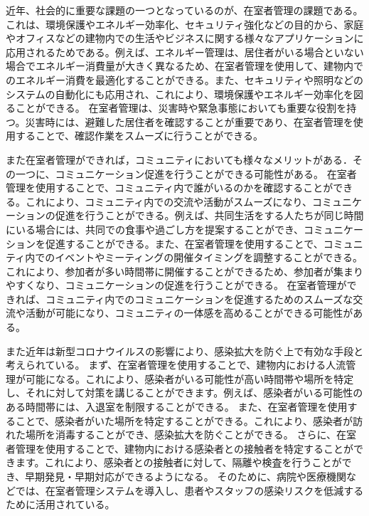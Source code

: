 近年、社会的に重要な課題の一つとなっているのが、在室者管理の課題である。これは、環境保護やエネルギー効率化、セキュリティ強化などの目的から、家庭やオフィスなどの建物内での生活やビジネスに関する様々なアプリケーションに応用されるためである。例えば、エネルギー管理は、居住者がいる場合といない場合でエネルギー消費量が大きく異なるため、在室者管理を使用して、建物内でのエネルギー消費を最適化することができる。また、セキュリティや照明などのシステムの自動化にも応用され、これにより、環境保護やエネルギー効率化を図ることができる。
在室者管理は、災害時や緊急事態においても重要な役割を持つ。災害時には、避難した居住者を確認することが重要であり、在室者管理を使用することで、確認作業をスムーズに行うことができる。

また在室者管理ができれば，コミュニティにおいても様々なメリットがある．その一つに、コミュニケーション促進を行うことができる可能性がある。
在室者管理を使用することで、コミュニティ内で誰がいるのかを確認することができる。これにより、コミュニティ内での交流や活動がスムーズになり、コミュニケーションの促進を行うことができる。例えば、共同生活をする人たちが同じ時間にいる場合には、共同での食事や過ごし方を提案することができ、コミュニケーションを促進することができる。また、在室者管理を使用することで、コミュニティ内でのイベントやミーティングの開催タイミングを調整することができる。これにより、参加者が多い時間帯に開催することができるため、参加者が集まりやすくなり、コミュニケーションの促進を行うことができる。
在室者管理ができれば、コミュニティ内でのコミュニケーションを促進するためのスムーズな交流や活動が可能になり、コミュニティの一体感を高めることができる可能性がある。

また近年は新型コロナウイルスの影響により、感染拡大を防ぐ上で有効な手段と考えられている。
まず、在室者管理を使用することで、建物内における人流管理が可能になる。これにより、感染者がいる可能性が高い時間帯や場所を特定し、それに対して対策を講じることができます。例えば、感染者がいる可能性のある時間帯には、入退室を制限することができる。
また、在室者管理を使用することで、感染者がいた場所を特定することができる。これにより、感染者が訪れた場所を消毒することができ、感染拡大を防ぐことができる。
さらに、在室者管理を使用することで、建物内における感染者との接触者を特定することができます。これにより、感染者との接触者に対して、隔離や検査を行うことができ、早期発見・早期対応ができるようになる。
そのために、病院や医療機関などでは、在室者管理システムを導入し、患者やスタッフの感染リスクを低減するために活用されている。

